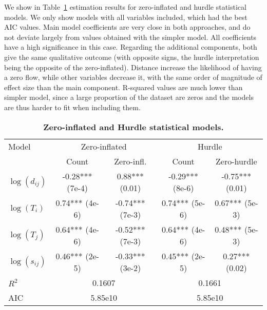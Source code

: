 We show in Table~\ref{tab:zeroinfl} estimation results for zero-inflated and hurdle statistical models. We only show models with all variables included, which had the best AIC values. Main model coefficients are very close in both approaches, and do not deviate largely from values obtained with the simpler model. All coefficients have a high significance in this case. Regarding the additional components, both give the same qualitative outcome (with opposite signs, the hurdle interpretation being the opposite of the zero-inflated). Distance increase the likelihood of having a zero flow, while other variables decrease it, with the same order of magnitude of effect size than the main component. R-squared values are much lower than simpler model, since a large proportion of the dataset are zeros and the models are thus harder to fit when including them.


\begin{table}[!ht]
\begin{adjustwidth}{-1in}{0in}
\caption{{\bf Zero-inflated and Hurdle statistical models.}\label{tab:zeroinfl}}
\medskip
\begin{tabular}{|l|c|c|c|c|}
\hline
Model  & \multicolumn{2}{|c|}{Zero-inflated} & \multicolumn{2}{|c|}{Hurdle} \\ 
 & Count & Zero-infl. & Count & Zero-hurdle \\
\hline
$\log(d_{ij})$ &    -0.28*** (7e-4) &   0.88*** (0.01)      &   -0.29*** (8e-6)   &  -0.75*** (0.01)    \\
$\log(T_i)$ & 0.74*** (4e-6)  & -0.74*** (7e-3)       &   0.74***  (5e-6)     &  0.67*** (5e-3)   \\
$\log(T_j)$ & 0.64*** (4e-6)  & -0.52*** (7e-3)      &    0.64***  (4e-6)     &  0.48*** (5e-3)    \\
$\log(s_{ij})$ & 0.46*** (2e-5)   &  -0.33*** (3e-2)  &  0.45*** (2e-5)       &  0.27*** (0.02)    \\
\hline
$R^2$ &   \multicolumn{2}{|c|}{0.1607}     &  \multicolumn{2}{|c|}{0.1661}  \\
AIC &     \multicolumn{2}{|c|}{5.85e10}    &   \multicolumn{2}{|c|}{5.85e10}  \\
\hline
\end{tabular}
\end{adjustwidth}
\end{table}

